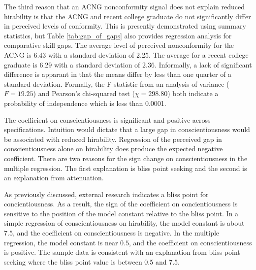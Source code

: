 \documentclass[review]{elsarticle}
\begin{document}
The third reason that an ACNG nonconformity signal does not explain reduced hirability is that the ACNG and recent college graduate do not significantly differ in perceived levels of conformity.
This is presently demonstrated using summary statistics, but Table \ref{tab:gap_of_gaps} also provides regression analysis for comparative skill gaps.
The average level of perceived nonconformity for the ACNG is 6.43 with a standard deviation of 2.25.
The average for a recent college graduate is 6.29 with a standard deviation of 2.36.
Informally, a lack of significant difference is apparant in that the means differ by less than one quarter of a standard deviation.
Formally, the F-statistic from an analysis of variance ($F = 19.25$) and Pearson's chi-squared test ($\chi = 298.80$) both indicate a probability of independence which is less than 0.0001.

The coefficient on conscientiousness is significant and positive across specifications.
Intuition would dictate that a large gap in conscientiousness would be associated with reduced hirability.
Regression of the perceived gap in conscientiousness alone on hirability does produce the expected negative coefficient.
There are two reasons for the sign change on conscientiousness in the multiple regression.
The first explanation is bliss point seeking and the second is an explanation from attenuation.

As previously discussed, external research indicates a bliss point for concientiousness.
As a result, the sign of the coefficient on concientiousness is sensitive to the position of the model constant relative to the bliss point.
In a simple regression of conscientiousness on hirability, the model constant is about $7.5$, and the coefficient on conscientiousness is negative.
In the multiple regression, the model constant is near $0.5$, and the coefficient on conscientiousness is positive.
The sample data is consistent with an explanation from bliss point seeking where the bliss point value is between 0.5 and 7.5.
\end{document}

